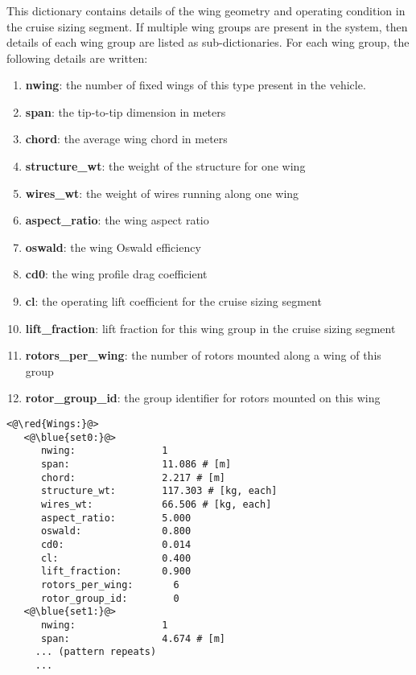\subsubsection{}
This dictionary contains details of the wing geometry and operating condition in the cruise sizing segment. If multiple wing groups are present in the system, then details of each wing group are listed as sub-dictionaries. For each wing group, the following details are written:
\begin{enumerate}
\item \textbf{nwing}: the number of fixed wings of this type present in the vehicle.
\item \textbf{span}: the tip-to-tip dimension in meters
\item \textbf{chord}: the average wing chord in meters
\item \textbf{structure\_wt}: the weight of the structure for one wing
\item \textbf{wires\_wt}: the weight of wires running along one wing
\item \textbf{aspect\_ratio}: the wing aspect ratio 
\item \textbf{oswald}: the wing Oswald efficiency
\item \textbf{cd0}: the wing profile drag coefficient
\item \textbf{cl}: the operating lift coefficient for the cruise sizing segment
\item \textbf{lift\_fraction}: lift fraction for this wing group in the cruise sizing segment 
\item \textbf{rotors\_per\_wing}: the number of rotors mounted along a wing of this group
\item \textbf{rotor\_group\_id}: the group identifier for rotors mounted on this wing
\end{enumerate}
\begin{lstlisting}
<@\red{Wings:}@>
   <@\blue{set0:}@>
      nwing:               1 
      span:                11.086 # [m]
      chord:               2.217 # [m]
      structure_wt:        117.303 # [kg, each] 
      wires_wt:            66.506 # [kg, each] 
      aspect_ratio:        5.000 
      oswald:              0.800 
      cd0:                 0.014 
      cl:                  0.400 
      lift_fraction:       0.900 
      rotors_per_wing:       6 
      rotor_group_id:        0
   <@\blue{set1:}@>
      nwing:               1 
      span:                4.674 # [m]
	 ... (pattern repeats)
	 ...
\end{lstlisting}

